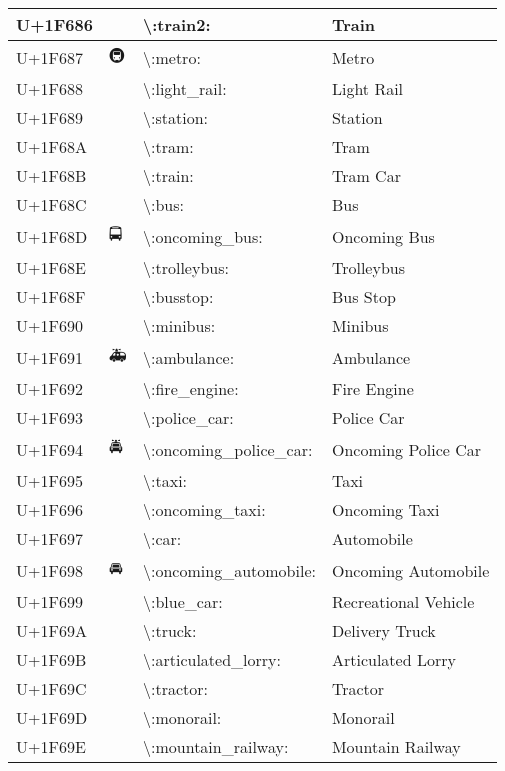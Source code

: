 \begin{table}[h]
\begin{tabulary}{\linewidth}{|L|L|L|L|}
\hline
U+1F686 & 🚆 & {\textbackslash}:train2: & Train \\
\hline
U+1F687 & 🚇 & {\textbackslash}:metro: & Metro \\
\hline
U+1F688 & 🚈 & {\textbackslash}:light\_rail: & Light Rail \\
\hline
U+1F689 & 🚉 & {\textbackslash}:station: & Station \\
\hline
U+1F68A & 🚊 & {\textbackslash}:tram: & Tram \\
\hline
U+1F68B & 🚋 & {\textbackslash}:train: & Tram Car \\
\hline
U+1F68C & 🚌 & {\textbackslash}:bus: & Bus \\
\hline
U+1F68D & 🚍 & {\textbackslash}:oncoming\_bus: & Oncoming Bus \\
\hline
U+1F68E & 🚎 & {\textbackslash}:trolleybus: & Trolleybus \\
\hline
U+1F68F & 🚏 & {\textbackslash}:busstop: & Bus Stop \\
\hline
U+1F690 & 🚐 & {\textbackslash}:minibus: & Minibus \\
\hline
U+1F691 & 🚑 & {\textbackslash}:ambulance: & Ambulance \\
\hline
U+1F692 & 🚒 & {\textbackslash}:fire\_engine: & Fire Engine \\
\hline
U+1F693 & 🚓 & {\textbackslash}:police\_car: & Police Car \\
\hline
U+1F694 & 🚔 & {\textbackslash}:oncoming\_police\_car: & Oncoming Police Car \\
\hline
U+1F695 & 🚕 & {\textbackslash}:taxi: & Taxi \\
\hline
U+1F696 & 🚖 & {\textbackslash}:oncoming\_taxi: & Oncoming Taxi \\
\hline
U+1F697 & 🚗 & {\textbackslash}:car: & Automobile \\
\hline
U+1F698 & 🚘 & {\textbackslash}:oncoming\_automobile: & Oncoming Automobile \\
\hline
U+1F699 & 🚙 & {\textbackslash}:blue\_car: & Recreational Vehicle \\
\hline
U+1F69A & 🚚 & {\textbackslash}:truck: & Delivery Truck \\
\hline
U+1F69B & 🚛 & {\textbackslash}:articulated\_lorry: & Articulated Lorry \\
\hline
U+1F69C & 🚜 & {\textbackslash}:tractor: & Tractor \\
\hline
U+1F69D & 🚝 & {\textbackslash}:monorail: & Monorail \\
\hline
U+1F69E & 🚞 & {\textbackslash}:mountain\_railway: & Mountain Railway \\

\end{tabulary}
\end{table}
